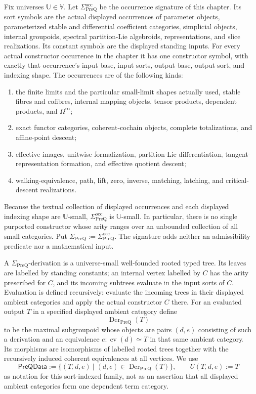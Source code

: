\begin{definition}
\label{def:prequantum-output-closure}
Fix universes $\mathbb U\in\mathbb V$.  Let
$\Sigma_{\mathrm{PreQ}}^{\mathrm{occ}}$ be the occurrence signature of this
chapter.  Its sort symbols are the actual displayed occurrences of parameter
objects, parameterized stable and differential coefficient categories,
simplicial objects, internal groupoids, spectral partition-Lie algebroids,
representations, and slice realizations.  Its constant symbols are the displayed
standing inputs.  For every actual constructor occurrence in the chapter it has
one constructor symbol, with exactly that occurrence's input base, input sorts,
output base, output sort, and indexing shape.  The occurrences are of the
following kinds:
\begin{enumerate}
\item the finite limits and the particular small-limit shapes actually used,
      stable fibres and cofibres, internal mapping objects, tensor products,
      dependent products, and $\Omega^\infty$;
\item exact functor categories, coherent-cochain objects, complete
      totalizations, and affine-point descent;
\item effective images, unitwise formalization, partition-Lie differentiation,
      tangent-representation formation, and effective quotient descent;
\item walking-equivalence, path, lift, zero, inverse, matching, latching, and
      critical-descent realizations.
\end{enumerate}
Because the textual collection of displayed occurrences and each displayed
indexing shape are $\mathbb U$-small,
$\Sigma_{\mathrm{PreQ}}^{\mathrm{occ}}$ is $\mathbb U$-small.  In particular,
there is no single purported constructor whose arity ranges over an unbounded
collection of all small categories.  Put
$\Sigma_{\mathrm{PreQ}}:=\Sigma_{\mathrm{PreQ}}^{\mathrm{occ}}$.  The signature
adds neither an admissibility predicate nor a mathematical input.

A $\Sigma_{\mathrm{PreQ}}$-derivation is a universe-small well-founded rooted
typed tree.  Its leaves are labelled by standing constants; an internal vertex
labelled by $C$ has the arity prescribed for $C$, and its incoming subtrees
evaluate in the input sorts of $C$.  Evaluation is defined recursively: evaluate
the incoming trees in their displayed ambient categories and apply the actual
constructor $C$ there.  For an evaluated output $T$ in a specified displayed
ambient category define
\[
\boxed{
\operatorname{Der}_{\mathrm{PreQ}}(T)
}
\]
to be the maximal subgroupoid whose objects are pairs $(d,e)$ consisting of such
a derivation and an equivalence
$e:\operatorname{ev}(d)\simeq T$ in that same ambient category.  Its morphisms
are isomorphisms of labelled rooted trees together with the recursively induced
coherent equivalences at all vertices.  We use
\[
\boxed{
\mathsf{PreQData}:=\{(T,d,e)\mid(d,e)\in
\operatorname{Der}_{\mathrm{PreQ}}(T)\},
\qquad U(T,d,e):=T
}
\]
as notation for this sort-indexed family, not as an assertion that all displayed
ambient categories form one dependent term category.


\end{definition}
